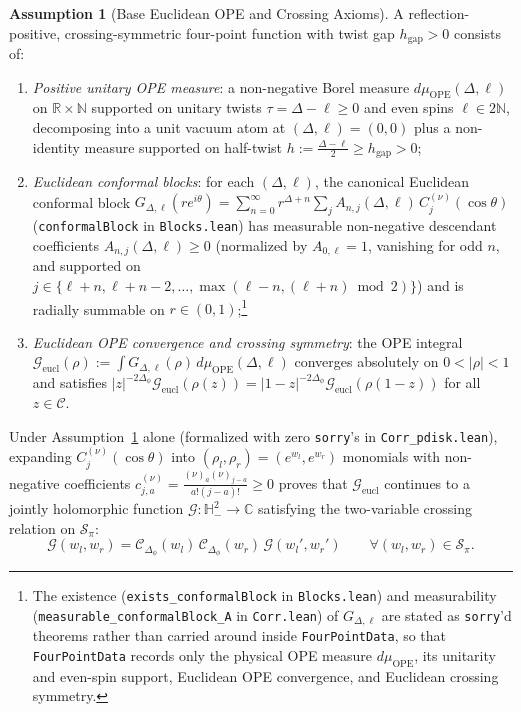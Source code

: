 \documentclass[10pt,a4paper]{article}
\theoremstyle{definition}
\newtheorem{assumption}{Assumption}
\begin{document}
\begin{assumption}[Base Euclidean OPE and Crossing Axioms]
\label{assump:base}
A reflection-positive, crossing-symmetric four-point function with twist gap $h_{\mathrm{gap}} > 0$ consists of:
\begin{enumerate}
  \item \emph{Positive unitary OPE measure}: a non-negative Borel measure $d\mu_{\mathrm{OPE}}(\Delta, \ell)$ on $\mathbb{R} \times \mathbb{N}$ supported on unitary twists $\tau = \Delta - \ell \ge 0$ and even spins $\ell \in 2\mathbb{N}$, decomposing into a unit vacuum atom at $(\Delta, \ell) = (0, 0)$ plus a non-identity measure supported on half-twist $h := \frac{\Delta - \ell}{2} \ge h_{\mathrm{gap}} > 0$;
  \item \emph{Euclidean conformal blocks}: for each $(\Delta, \ell)$, the canonical Euclidean conformal block $G_{\Delta, \ell}(r e^{i\theta}) = \sum_{n=0}^\infty r^{\Delta + n} \sum_{j} A_{n, j}(\Delta, \ell) \, C_j^{(\nu)}(\cos\theta)$ (\texttt{conformalBlock} in \texttt{Blocks.lean}) has measurable non-negative descendant coefficients $A_{n, j}(\Delta, \ell) \ge 0$ (normalized by $A_{0, \ell} = 1$, vanishing for odd $n$, and supported on $j \in \{\ell + n, \ell + n - 2, \dots, \max(\ell - n, (\ell + n) \bmod 2)\}$) and is radially summable on $r \in (0, 1)$;\footnote{The existence (\texttt{exists\_conformalBlock} in \texttt{Blocks.lean}) and measurability (\texttt{measurable\_conformalBlock\_A} in \texttt{Corr.lean}) of $G_{\Delta, \ell}$ are stated as \texttt{sorry}'d theorems rather than carried around inside \texttt{FourPointData}, so that \texttt{FourPointData} records only the physical OPE measure $d\mu_{\mathrm{OPE}}$, its unitarity and even-spin support, Euclidean OPE convergence, and Euclidean crossing symmetry.}
  \item \emph{Euclidean OPE convergence and crossing symmetry}: the OPE integral $\mathcal{G}_{\mathrm{eucl}}(\rho) := \int G_{\Delta, \ell}(\rho) \, d\mu_{\mathrm{OPE}}(\Delta, \ell)$ converges absolutely on $0 < |\rho| < 1$ and satisfies $|z|^{-2\Delta_\phi} \mathcal{G}_{\mathrm{eucl}}(\rho(z)) = |1 - z|^{-2\Delta_\phi} \mathcal{G}_{\mathrm{eucl}}(\rho(1 - z))$ for all $z \in \mathcal{C}$.
\end{enumerate}
\end{assumption}

Under Assumption~\ref{assump:base} alone (formalized with zero \texttt{sorry}'s in \texttt{Corr\_pdisk.lean}), expanding $C_j^{(\nu)}(\cos\theta)$ into $(\rho_l, \rho_r) = (e^{w_l}, e^{w_r})$ monomials with non-negative coefficients $c_{j, a}^{(\nu)} = \frac{(\nu)_a (\nu)_{j - a}}{a! (j - a)!} \ge 0$ proves that $\mathcal{G}_{\mathrm{eucl}}$ continues to a jointly holomorphic function $\mathcal{G} : \mathbb{H}_-^2 \to \mathbb{C}$ satisfying the two-variable crossing relation on $\mathcal{S}_\pi$:
\begin{equation}
  \label{eq:two-var-crossing}
  \mathcal{G}(w_l, w_r) = \mathcal{C}_{\Delta_\phi}(w_l) \, \mathcal{C}_{\Delta_\phi}(w_r) \, \mathcal{G}(w_l', w_r') \qquad \forall (w_l, w_r) \in \mathcal{S}_\pi.
\end{equation}
\end{document}
